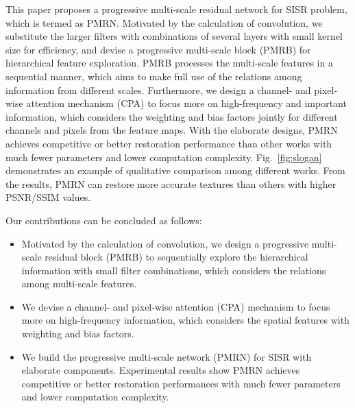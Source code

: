 \documentclass[journal]{IEEEtran}
\begin{document}
This paper proposes a progressive multi-scale residual network for SISR problem, which is termed as PMRN. Motivated by the calculation of convolution, we substitute the larger filters with combinations of several layers with small kernel size for efficiency, and devise a progressive multi-scale block (PMRB) for hierarchical feature exploration. PMRB processes the multi-scale features in a sequential manner, which aims to make full use of the relations among information from different scales. Furthermore, we design a channel- and pixel-wise attention mechanism (CPA) to focus more on high-frequency and important information, which considers the weighting and bias factors jointly for different channels and pixels from the feature maps. With the elaborate designs, PMRN achieves competitive or better restoration performance than other works with much fewer parameters and lower computation complexity. Fig.~\ref{fig:slogan} demonstrates an example of qualitative comparison among different works. From the results, PMRN can restore more accurate textures than others with higher PSNR/SSIM values.

Our contributions can be concluded as follows:
\begin{itemize}
	\item
	Motivated by the calculation of convolution, we design a progressive multi-scale residual block (PMRB) to sequentially explore the hierarchical information with small filter combinations, which considers the relations among multi-scale features.
	\item
	We devise a channel- and pixel-wise attention (CPA) mechanism to focus more on high-frequency information, which considers the spatial features with weighting and bias factors.
	\item
	We build the progressive multi-scale network (PMRN) for SISR with elaborate components. Experimental results show PMRN achieves competitive or better restoration performances with much fewer parameters and lower computation complexity.
\end{itemize}
\end{document}
